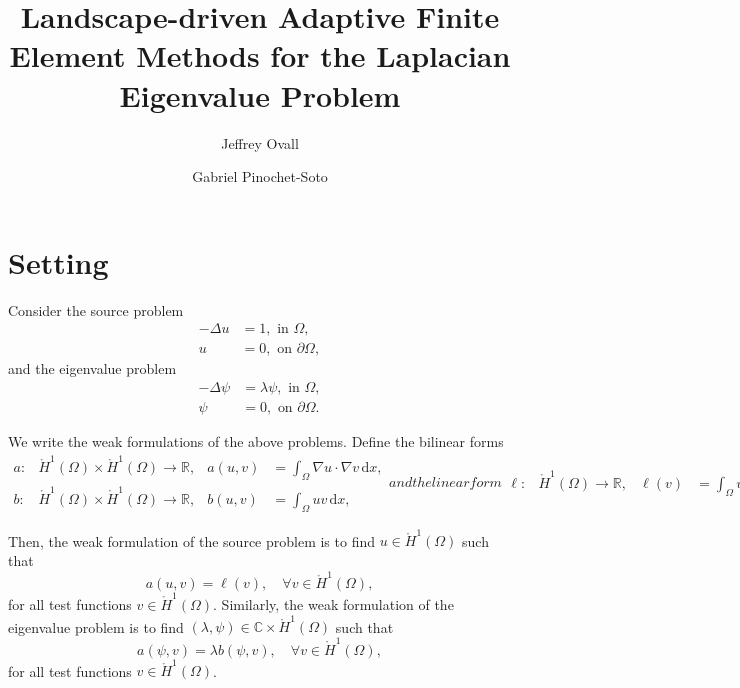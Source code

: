 \documentclass[12pt]{amsart}
\title[Landscape-driven AFEM]{Landscape-driven Adaptive Finite Element Methods for the Laplacian Eigenvalue Problem}
\author{
    Jeffrey Ovall \and %
    Gabriel Pinochet-Soto \orcidID{0009-0008-0626-8194} %
}
\begin{document}
\maketitle

\section{Setting}

Consider the source problem
\begin{subequations}
\begin{align}
    \label{eq:source}
    - \Delta u  & = 1, \text{ in } \Omega, \\
    u & = 0, \text{ on } \partial \Omega,
\end{align}
\end{subequations}
and the eigenvalue problem
\begin{subequations}
\begin{align}
    \label{eq:eigenvalue}
    - \Delta \psi & = \lambda \psi, \text{ in } \Omega, \\
    \psi & = 0, \text{ on } \partial \Omega.
\end{align}
\end{subequations}

We write the weak formulations of the above problems.
Define the bilinear forms
\begin{subequations}
\begin{align}
    a: & \mathring{H}^1(\Omega) \times \mathring{H}^1(\Omega) \to \mathbb{R}, &
    a(u, v) & = \int_{\Omega} \nabla u \cdot \nabla v \, \mathrm{d}x, \\
    b: & \mathring{H}^1(\Omega) \times \mathring{H}^1(\Omega) \to \mathbb{R}, &
    b(u, v) & = \int_{\Omega} u v \, \mathrm{d}x,
\end{align}
and the linear form
\begin{align}
    \ell: & \mathring{H}^1(\Omega) \to \mathbb{R}, &
    \ell (v) & = \int_{\Omega} v \, \mathrm{d}x.
\end{align}
\end{subequations}

Then, the weak formulation of the source problem is to find \(u \in \mathring{H}^1(\Omega)\) such that
\begin{equation}
    \label{eq:source_weak}
    a(u, v) = \ell(v), \quad \forall v \in \mathring{H}^1(\Omega),
\end{equation}
for all test functions \(v \in \mathring{H}^1(\Omega)\).
Similarly, the weak formulation of the eigenvalue problem is to find \((\lambda, \psi) \in \mathbb{C} \times \mathring{H}^1(\Omega)\) such that
\begin{equation}
    \label{eq:eigenvalue_weak}
    a(\psi, v) = \lambda b(\psi, v), \quad \forall v \in \mathring{H}^1(\Omega),
\end{equation}
for all test functions \(v \in \mathring{H}^1(\Omega)\).
\end{document}
